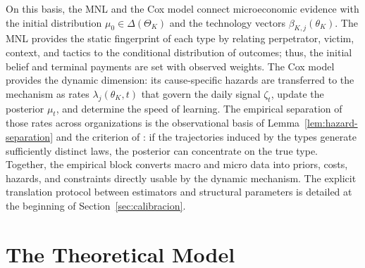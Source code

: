 \documentclass[review,authoryear,12pt]{elsarticle}
\theoremstyle{plain}
\theoremstyle{definition}
\newcommand{\ThetaK}{\Theta_K}
\newcommand{\1}{\mathbf{1}}
\begin{document}
On this basis, the MNL and the Cox model connect microeconomic evidence with the initial distribution $\mu_0\in\Delta(\ThetaK)$ and the technology vectors $\beta_{K,j}(\theta_K)$. The MNL provides the static fingerprint of each type by relating perpetrator, victim, context, and tactics to the conditional distribution of outcomes; thus, the initial belief and terminal payments are set with observed weights. The Cox model provides the dynamic dimension: its cause-specific hazards are transferred to the mechanism as rates $\lambda_j(\theta_K,t)$ that govern the daily signal $\zeta_t$, update the posterior $\mu_t$, and determine the speed of learning. The empirical separation of those rates across organizations is the observational basis of Lemma~\ref{lem:hazard-separation} and the criterion of \citet{Kakutani1948}: if the trajectories induced by the types generate sufficiently distinct laws, the posterior can concentrate on the true type. Together, the empirical block converts macro and micro data into priors, costs, hazards, and constraints directly usable by the dynamic mechanism. The explicit translation protocol between estimators and structural parameters is detailed at the beginning of Section~\ref{sec:calibracion}.

\section{The Theoretical Model}\label{sec:model}
\end{document}
